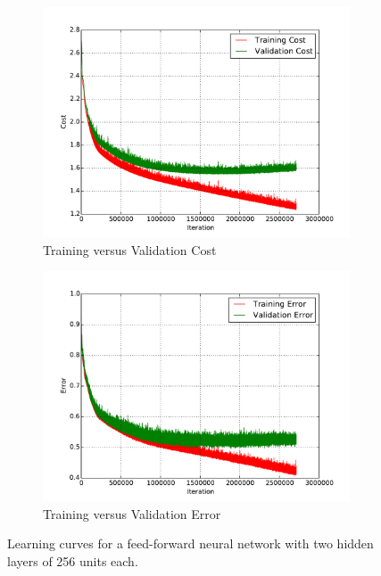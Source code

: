 \begin{figure}
	\centering
	\begin{subfigure}[b]{0.45\linewidth}
		\centering
		\includegraphics[width=\linewidth]{images/0/train_val_cost.pdf}
		\caption{Training versus Validation Cost}
	\end{subfigure}
	\hfill
	\begin{subfigure}[b]{0.45\linewidth}
		\centering
		\includegraphics[width=\linewidth]{images/0/train_val_error.pdf}
		\caption{Training versus Validation Error}
	\end{subfigure}
	\caption{Learning curves for a feed-forward neural network with two hidden layers of 256 units each.}
	\label{shrine0_curves}
\end{figure}
